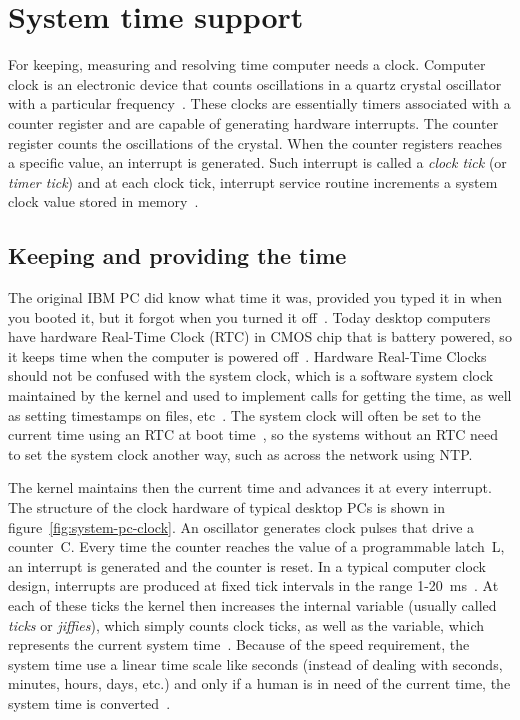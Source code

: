 
\chapter{System time support}
For keeping, measuring and resolving time computer needs a clock.
Computer clock is an electronic device that counts oscillations in a
quartz crystal oscillator with a particular frequency~\cite{thesis-sync}.
These clocks are essentially timers associated with a counter register and
are capable of generating hardware interrupts.
The counter register counts the oscillations of the crystal.
When the counter registers reaches a specific value,
an interrupt is generated.
Such interrupt is called a {\it{clock tick}} (or {\it{timer tick}}) and at each clock tick,
interrupt service routine increments a system clock value stored in memory~\cite{thesis-sync}.

\section{Keeping and providing the time}\label{sec:system-keeping-and-providing}
The original IBM PC did know what time it was, provided you typed it in when you booted it,
but it forgot when you turned it off~\cite{timecounters}.
Today desktop computers %
have hardware Real-Time Clock (RTC) in CMOS chip that is battery powered,
so it keeps time when the computer is powered off~\cite{timecounters}.
Hardware Real-Time Clocks should not be confused with the system clock,
which is a software system clock maintained by
the kernel and used to implement calls for getting the time,
as well as setting timestamps on files, etc~\cite{linux-man-rtc}.
The system clock will often be set to the current time using an RTC at boot time~\cite{linux-man-rtc},
so the systems without an RTC need to set the system clock another way,
such as across the network using NTP.

The kernel maintains then the current time and advances it at every interrupt.
The structure of the clock hardware of
typical desktop PCs is shown in figure~\ref{fig:system-pc-clock}.
An oscillator generates clock pulses that drive a counter~C.
Every time the counter reaches the value of a programmable latch~L,
an interrupt is generated and the counter is reset.
In a typical computer clock design, interrupts are produced at
fixed tick intervals in the range 1-20~ms~\cite{nanokernel}.
At each of these ticks the kernel then increases the internal variable
(usually called {\it{ticks}} or {\it{jiffies}}), which simply counts clock ticks,
as well as the variable, which represents the current system time~\cite{thesis-beat}.
Because of the speed requirement,
the system time use a linear time scale like seconds
(instead of dealing with seconds, minutes, hours, days, etc.)
and only if a human is in need of the current time,
the system time is converted~\cite{ntp-faq}.

